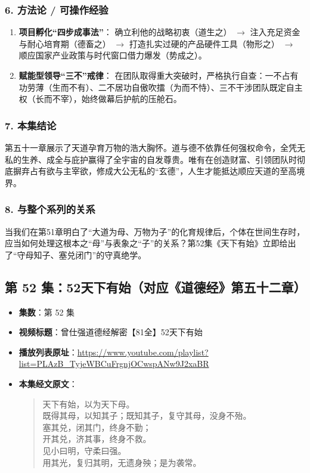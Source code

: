 \subsubsection{6. 方法论 / 可操作经验}
\begin{enumerate}
    \item \textbf{项目孵化“四步成事法”}：
    确立利他的战略初衷（道生之） $\rightarrow$ 注入充足资金与耐心培育期（德畜之） $\rightarrow$ 打造扎实过硬的产品硬件工具（物形之） $\rightarrow$ 顺应国家产业政策与时代窗口借力爆发（势成之）。
    \item \textbf{赋能型领导“三不”戒律}：
    在团队取得重大突破时，严格执行自查：一不占有功劳薄（生而不有）、二不居功自傲吹擂（为而不恃）、三不干涉团队既定自主权（长而不宰），始终做幕后护航的压舱石。
\end{enumerate}

\subsubsection{7. 本集结论}
第五十一章展示了天道孕育万物的浩大胸怀。道与德不依靠任何强权命令，全凭无私的生养、成全与庇护赢得了全宇宙的自发尊贵。唯有在创造财富、引领团队时彻底摒弃占有欲与主宰欲，修成大公无私的“玄德”，人生才能抵达顺应天道的至高境界。

\subsubsection{8. 与整个系列的关系}
当我们在第51章明白了“大道为母、万物为子”的化育规律后，个体在世间生存时，应当如何处理这根本之“母”与表象之“子”的关系？第52集《天下有始》立即给出了“守母知子、塞兑闭门”的守真绝学。

\clearpage

\subsection{第 52 集：52天下有始（对应《道德经》第五十二章）}
\label{sec:ep52}

\begin{itemize}
    \item \textbf{集数}：第 52 集
    \item \textbf{视频标题}：曾仕强道德经解密【81全】52天下有始
    \item \textbf{播放列表原址}：\url{https://www.youtube.com/playlist?list=PLAzB_TyjeWBCuFrgnjOCwspANw9J2xaBR}
    \item \textbf{本集经文原文}：
    \begin{quote}\kaishu
    天下有始，以为天下母。\\
    既得其母，以知其子；既知其子，复守其母，没身不殆。\\
    塞其兑，闭其门，终身不勤；\\
    开其兑，济其事，终身不救。\\
    见小曰明，守柔曰强。\\
    用其光，复归其明，无遗身殃；是为袭常。
    \end{quote}
\end{itemize}


